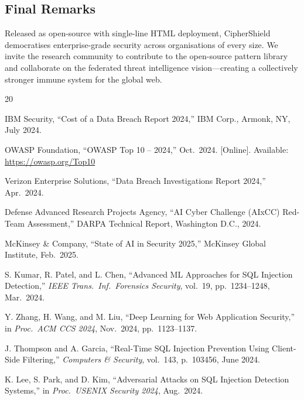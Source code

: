\documentclass[10pt,twocolumn]{article}
\begin{document}
\subsection{Final Remarks}

Released as open-source with single-line HTML deployment, CipherShield
democratises enterprise-grade security across organisations of every
size. We invite the research community to contribute to the open-source
pattern library and collaborate on the federated threat intelligence
vision---creating a collectively stronger immune system for the global web.

\balance
\begin{thebibliography}{20}

IBM Security, ``Cost of a Data Breach Report 2024,'' IBM Corp.,
Armonk, NY, July 2024.

OWASP Foundation, ``OWASP Top 10 -- 2024,'' Oct.\ 2024.
[Online]. Available: \url{https://owasp.org/Top10}

Verizon Enterprise Solutions, ``Data Breach Investigations
Report 2024,'' Apr.\ 2024.

Defense Advanced Research Projects Agency, ``AI Cyber Challenge
(AIxCC) Red-Team Assessment,'' DARPA Technical Report,
Washington D.C., 2024.

McKinsey \& Company, ``State of AI in Security 2025,''
McKinsey Global Institute, Feb.\ 2025.

S. Kumar, R. Patel, and L. Chen, ``Advanced ML Approaches for
SQL Injection Detection,''
\textit{IEEE Trans.\ Inf.\ Forensics Security}, vol.~19,
pp.~1234--1248, Mar.\ 2024.

Y. Zhang, H. Wang, and M. Liu, ``Deep Learning for Web Application
Security,'' in \textit{Proc.\ ACM CCS 2024}, Nov.\ 2024,
pp.~1123--1137.

J. Thompson and A. Garcia, ``Real-Time SQL Injection Prevention
Using Client-Side Filtering,''
\textit{Computers \& Security}, vol.~143, p.~103456, June 2024.

K. Lee, S. Park, and D. Kim, ``Adversarial Attacks on SQL Injection
Detection Systems,'' in \textit{Proc.\ USENIX Security 2024},
Aug.\ 2024.


\end{thebibliography}
\end{document}
